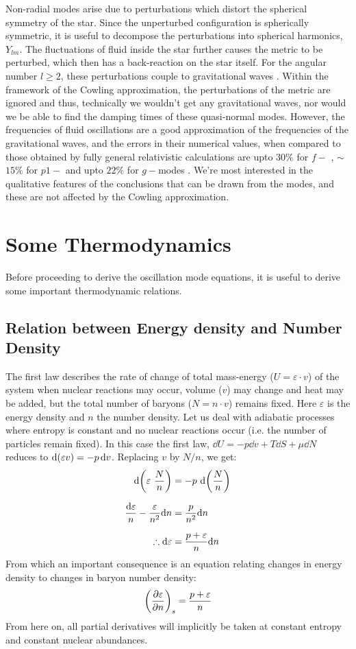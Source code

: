 \documentclass[a4paper,12pt,onehalfspacing]{report}
\begin{document}
Non-radial modes arise due to perturbations which distort the spherical symmetry of the star. Since the unperturbed configuration is spherically symmetric, it is useful to decompose the perturbations into spherical harmonics, $Y_{lm}$. The fluctuations of fluid inside the star further causes the metric to be perturbed, which then has a back-reaction on the star itself. For the angular number $l\geq 2$, these perturbations couple to gravitational waves \cite{Thorne_Campo}. Within the framework of the Cowling approximation, the perturbations of the metric are ignored and thus, technically we wouldn't get any gravitational waves, nor would we be able to find the damping times of these quasi-normal modes. However, the frequencies of fluid oscillations are a good approximation of the frequencies of the gravitational waves, and the errors in their numerical values, when compared to those obtained by fully general relativistic calculations are upto $30\%$ for $f-$ \cite{Kunjipurayil_f_p}, \(\sim \)$15\%$ for $p1-$ \cite{Kunjipurayil_f_p} and upto $22\%$ for $g-$modes \cite{Zhao_universal_f_g}. We're most interested in the qualitative features of the conclusions that can be drawn from the modes, and these are not affected by the Cowling approximation.

\section{Some Thermodynamics}
Before proceeding to derive the oscillation mode equations, it is useful to derive some important thermodynamic relations.
 
\subsection{Relation between Energy density and Number Density}
The first law describes the rate of change of total mass-energy ($U= \varepsilon\cdot v$) of the system when
nuclear reactions may occur, volume ($v$) may change and heat may be added, but the
total number of baryons ($N= n\cdot v$) remains fixed. Here $\varepsilon$ is the energy density and $n$ the number density. Let us deal with adiabatic processes where entropy is constant and no nuclear reactions occur (i.e. the number of particles
remain fixed). In this case the first law, $\dd{U}= -p\dd{v}+T\dd{S}+ \mu \dd{N}$ reduces to $\dd\qty(\varepsilon v)= -p\dd{v}$. Replacing $v$ by $N/n$, we get:
\begin{align*}
    \dd\qty({\varepsilon\  \frac{N}{n}})&= -p\ \dd\qty(\frac{N}{n})\\[1.5ex]
    \frac{\dd{\varepsilon}}{n}- \frac{\varepsilon}{n^2}\dd n&= \frac{p}{n^2}\dd n \\[1.5ex]
    \therefore\dd{\varepsilon}&= \frac{p+\varepsilon}{n}\dd n
\end{align*}
From which an important consequence is an equation relating changes in energy density to changes in baryon number density: 
\begin{equation}
    \qty(\pdv{\varepsilon}{n})_{s}= \frac{p+\varepsilon}{n} \label{eq: de/dn}
\end{equation}
From here on, all partial derivatives will implicitly be taken at constant entropy and constant nuclear abundances. 
\end{document}
